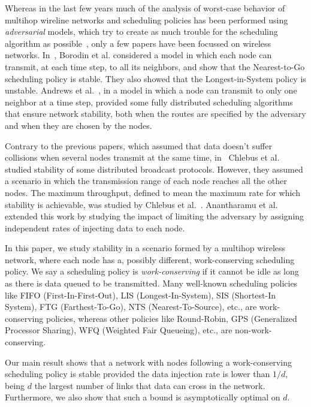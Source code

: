 \documentclass[journal,twocolumn]{./IEEEtran}
\begin{document}
Whereas in the last few years much of the analysis of worst-case behavior of multihop wireline networks and scheduling policies has been performed using \emph{adversarial} models,
which
try to create as much trouble for the scheduling algorithm as possible~\cite{aafkll01,Ech:Uni}, 
only a few papers have been focussed on wireless networks. In~\cite{DBLP:journals/join/BorodinOR04}, Borodin et al. considered a model in which each node can transmit, at each time step, to all its neighbors, and show that the Nearest-to-Go scheduling policy is stable. They also showed that the Longest-in-System policy is unstable. Andrews et al.~\cite{DBLP:journals/talg/AndrewsZ07}, in a model in which a node can transmit to only one neighbor at 
a
time step, 
provided some fully distributed scheduling algorithms that ensure network stability, both when the routes are specified by the adversary and when they are chosen by the nodes.

Contrary to the previous papers, which assumed that data doesn't suffer collisions when several nodes transmit at the same time, in~\cite{1146398} Chlebus et al. studied stability of some distributed broadcast protocols. However, they assumed a scenario in which the transmission range of each node reaches all the other nodes. The maximum throughput, defined to mean the maximum rate for which stability is achievable, was studied by Chlebus et al.~\cite{DBLP:journals/dc/ChlebusKR09}. Anantharamu et al.~\cite{DBLP:conf/opodis/AnantharamuCR09} extended this work by studying the impact of limiting the adversary by assigning independent rates of injecting data 
to
each node.

In this paper, we study stability in a scenario formed by a multihop wireless network, where each node has a, possibly different, work-conserving scheduling policy. We say a scheduling policy is {\em work-conserving} if it cannot be idle as long as there is data queued to be transmitted. Many well-known scheduling policies like FIFO (First-In-First-Out), LIS (Longest-In-System), SIS (Shortest-In System), FTG (Farthest-To-Go), NTS (Nearest-To-Source), etc., are work-conserving policies, whereas other policies like Round-Robin, GPS (Generalized Processor Sharing), WFQ (Weighted Fair Queueing), etc., are non-work-conserving.



Our main result shows that a network with nodes following a work-conserving scheduling policy is stable provided the data injection rate is lower than $1/d$, being $d$ the largest number of links that data can cross in the network. Furthermore, we also show that such a bound is asymptotically optimal on $d$.
\end{document}
